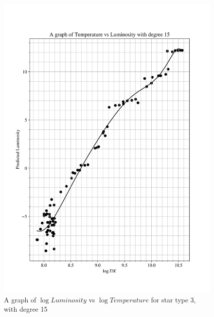 \documentclass[12pt, a4paper]{article}
\begin{document}
\begin{figure}[H]
    \centering
    \includegraphics[width = \textwidth]{2Plot4_15.png}
    \caption{A graph of \(\log{Luminosity}\) vs \(\log{Temperature}\) for star type 3, with degree 15}
    \label{fig:Fig 2.6}
\end{figure}
\end{document}
